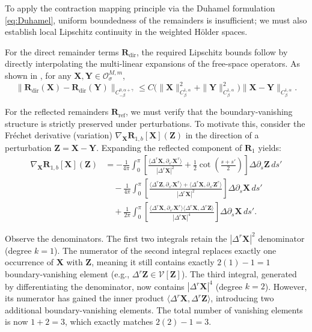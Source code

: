 \documentclass{amsart}
\newcommand{\mX}{\mathbf{X}}
\begin{document}
To apply the contraction mapping principle via the Duhamel formulation \eqref{eq:Duhamel}, uniform boundedness of the remainders is insufficient; we must also establish local Lipschitz continuity in the weighted Hölder spaces. 

For the direct remainder terms $\mathbf{R}_{\mathrm{dir}}$, the required Lipschitz bounds follow by directly interpolating the multi-linear expansions of the free-space operators. As shown in \cite{mori2019well}, for any $\mathbf{X}, \mathbf{Y} \in \mathcal{O}^{M,m}_\sigma$, 
\begin{equation}
\|\mathbf{R}_{\mathrm{dir}}(\mathbf{X}) - \mathbf{R}_{\mathrm{dir}}(\mathbf{Y})\|_{C^{0,\alpha+\gamma}_{-\beta}} \le C\big(\|\mathbf{X}\|_{C^{1,\alpha}_\beta}^2 + \|\mathbf{Y}\|_{C^{1,\alpha}_\beta}^2\big) \|\mathbf{X} - \mathbf{Y}\|_{C^{1,\alpha}_\beta}.
\end{equation}

For the reflected remainders $\mathbf{R}_{\mathrm{ref}}$, we must verify that the boundary-vanishing structure is strictly preserved under perturbations. To motivate this, consider the Fréchet derivative (variation) $\nabla_{\mX} \mathbf{R}_{1,b}[\mathbf{X}](\mathbf{Z})$ in the direction of a perturbation $\mathbf{Z} = \mathbf{X} - \mathbf{Y}$. Expanding the reflected component of $\mathbf{R}_1$ yields:
\begin{align*}
\nabla_{\mX} \mathbf{R}_{1,b}[\mathbf{X}](\mathbf{Z}) 
&= - \frac{1}{4\pi} \int_0^\pi \left[ \frac{ \langle \Delta^r \mathbf{X}, \partial_{s'} \mathbf{X}^r \rangle }{ |\Delta^r \mathbf{X}|^2 } + \frac{1}{2}\cot\left( \frac{s+s'}{2} \right)\right] \Delta \partial_s \mathbf{Z} \, ds' \\
&\quad - \frac{1}{4\pi} \int_0^\pi \left[ \frac{ \langle \Delta^r \mathbf{Z}, \partial_{s'} \mathbf{X}^r \rangle + \langle \Delta^r \mathbf{X}, \partial_{s'} \mathbf{Z}^r \rangle }{ |\Delta^r \mathbf{X}|^2 } \right] \Delta \partial_s \mathbf{X} \, ds' \\
&\quad + \frac{1}{2\pi} \int_0^\pi \left[ \frac{ \langle \Delta^r \mathbf{X}, \partial_{s'} \mathbf{X}^r \rangle \langle \Delta^r \mathbf{X}, \Delta^r \mathbf{Z} \rangle }{ |\Delta^r \mathbf{X}|^4 } \right] \Delta \partial_s \mathbf{X} \, ds'.
\end{align*}

Observe the denominators. The first two integrals retain the $|\Delta^r \mathbf{X}|^2$ denominator (degree $k=1$). The numerator of the second integral replaces exactly one occurrence of $\mathbf{X}$ with $\mathbf{Z}$, meaning it still contains exactly $2(1)-1 = 1$ boundary-vanishing element (e.g., $\Delta^r \mathbf{Z} \in \mathcal{V}[\mathbf{Z}]$). The third integral, generated by differentiating the denominator, now contains $|\Delta^r \mathbf{X}|^4$ (degree $k=2$). However, its numerator has gained the inner product $\langle \Delta^r \mathbf{X}, \Delta^r \mathbf{Z} \rangle$, introducing two additional boundary-vanishing elements. The total number of vanishing elements is now $1 + 2 = 3$, which exactly matches $2(2)-1 = 3$. 
\end{document}
